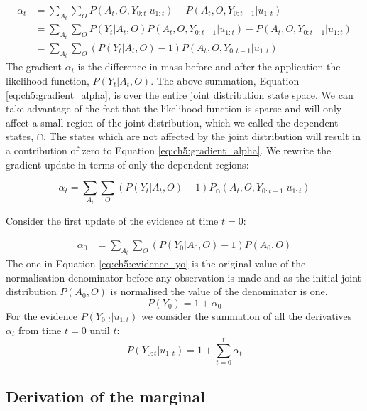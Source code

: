 \documentclass{frontiersSCNS} %
\begin{document}
\begin{align}
 \alpha_t  &= \sum\limits_{A_t}\sum\limits_{O} P(A_t,O,Y_{0:t}|u_{1:t}) - P(A_t,O,Y_{0:t-1}|u_{1:t})  \\
	   &= \sum\limits_{A_t}\sum\limits_{O} P(Y_t|A_t,O)P(A_t,O,Y_{0:t-1}|u_{1:t}) - P(A_t,O,Y_{0:t-1}|u_{1:t}) \\
	   &= \sum\limits_{A_t}\sum\limits_{O} (P(Y_t|A_t,O) - 1)P(A_t,O,Y_{0:t-1}|u_{1:t}) \label{eq:ch5:gradient_alpha}
\end{align}
The gradient $\alpha_t$ is the difference in mass before and after the application the likelihood function, $P(Y_t|A_t,O)$. The above 
summation, Equation \ref{eq:ch5:gradient_alpha}, is over the entire joint distribution state space. We can take advantage of the fact 
that the likelihood function is sparse and will only affect a small region of the joint distribution, which we called the dependent states, $\cap$.
The states which are not affected by the joint distribution will result in a contribution of zero to Equation \ref{eq:ch5:gradient_alpha}. We 
rewrite the gradient update in terms of only the dependent regions:

\begin{equation}
 \alpha_t = \sum\limits_{A_t}\sum\limits_{O} (P(Y_t|A_t,O) - 1)P_{\cap}(A_t,O,Y_{0:t-1}|u_{1:t})
\end{equation}

Consider the first update of the evidence at time $t=0$:

\begin{align}
 \alpha_0 &= \sum\limits_{A_t}\sum\limits_{O} (P(Y_0|A_0,O) - 1)P(A_0,O) 
\end{align}
The one in Equation \ref{eq:ch5:evidence_yo} is the original value of the normalisation denominator before any observation is made and as the 
initial joint distribution $P(A_0,O)$ is normalised the value of the denominator is one.
\begin{equation}
 P(Y_0) = 1 + \alpha_0 \label{eq:ch5:evidence_yo}
\end{equation}
For the evidence $P(Y_{0:t}|u_{1:t})$ we consider the summation of all the derivatives $\alpha_t$ from time $t=0$ until $t$:
\begin{equation}
 P(Y_{0:t}|u_{1:t}) = 1 + \sum_{t=0}^t \alpha_t \label{eq:ch5:evidence_y}
\end{equation}

\subsection{Derivation of the marginal}\label{appendix:marginal}
\end{document}
